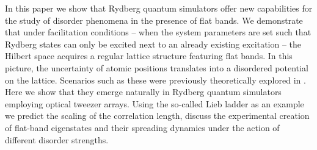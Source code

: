 \documentclass[prl,aps,twocolumn,showpacs,superscriptaddress,longbibliography]{revtex4-1}
\begin{document}
In this paper we show that Rydberg quantum simulators offer new capabilities for the study of disorder phenomena in the presence of flat bands. We demonstrate that under facilitation conditions -- when the system parameters are set such that Rydberg states can only be excited next to an already existing excitation -- the Hilbert space acquires a regular lattice structure featuring flat bands. In this picture, the uncertainty of atomic positions translates into a disordered potential on the lattice. Scenarios such as these were previously theoretically explored in \cite{Leykam2017, Bodyfelt2014}. Here we show that they emerge naturally in Rydberg quantum simulators employing optical tweezer arrays. Using the so-called Lieb ladder as an example we predict the scaling of the correlation length, discuss the experimental creation of flat-band eigenstates and their spreading dynamics under the action of different disorder strengths.



% 
%
\end{document}
